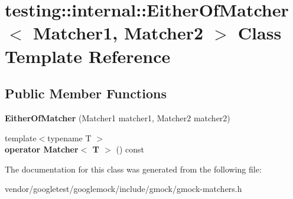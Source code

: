 \hypertarget{classtesting_1_1internal_1_1_either_of_matcher}{}\section{testing\+:\+:internal\+:\+:Either\+Of\+Matcher$<$ Matcher1, Matcher2 $>$ Class Template Reference}
\label{classtesting_1_1internal_1_1_either_of_matcher}
\subsection*{Public Member Functions}
\begin{DoxyCompactItemize}
\item 
\mbox{\label{classtesting_1_1internal_1_1_either_of_matcher_a5ae2361f20a0460870b72b83fcc0c643}} 
{\bfseries Either\+Of\+Matcher} (Matcher1 matcher1, Matcher2 matcher2)
\item 
\mbox{\label{classtesting_1_1internal_1_1_either_of_matcher_aef76a8b45451ec7abf845a2b9dd74bfb}} 
{\footnotesize template$<$typename T $>$ }\\{\bfseries operator Matcher$<$ T $>$} () const
\end{DoxyCompactItemize}


The documentation for this class was generated from the following file\+:\begin{DoxyCompactItemize}
\item 
vendor/googletest/googlemock/include/gmock/gmock-\/matchers.\+h\end{DoxyCompactItemize}
